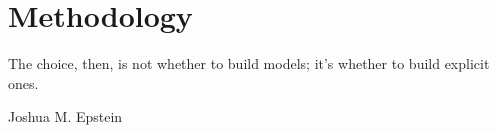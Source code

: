\chapter{Methodology} \label{chapter-methodology}
\epigraph{The choice, then, is not whether to build models; it's whether to build explicit ones.}{Joshua M. Epstein \cite{epsteinWhyModel2008}}







